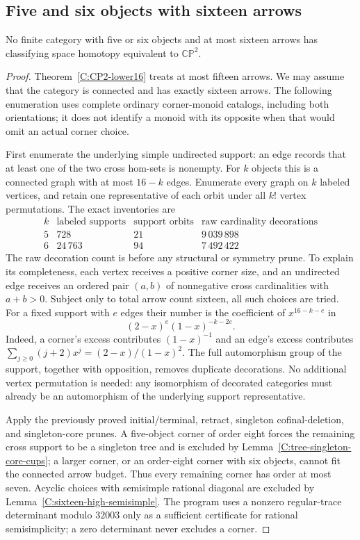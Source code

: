 \subsection{Five and six objects with sixteen arrows}

\begin{theorem}\label{C:sixteen-five-six-objects}
No finite category with five or six objects and at most sixteen
arrows has classifying space homotopy equivalent to
$\mathbb {CP}^2$.
\end{theorem}
\begin{proof}
Theorem~\ref{C:CP2-lower16} treats at most fifteen arrows.
We may assume that the category is connected and has exactly
sixteen arrows.  The following enumeration uses complete
ordinary corner-monoid catalogs, including both orientations;
it does not identify a monoid with its opposite when that
would omit an actual corner choice.

First enumerate the underlying simple undirected support:
an edge records that at least one of the two cross hom-sets
is nonempty.  For $k$ objects this is a connected graph with
at most $16-k$ edges.  Enumerate every graph on $k$ labeled
vertices, and retain one representative of each orbit under
all $k!$ vertex permutations.  The exact inventories are
\[
\begin{array}{c|r|r|r}
 k&\text{labeled supports}&\text{support orbits}&
 \text{raw cardinality decorations}\\ \hline
 5&728&21&9\,039\,898\\
 6&24\,763&94&7\,492\,422
\end{array}
\]
The raw decoration count is before any structural or symmetry
prune.  To explain its completeness, each vertex receives a
positive corner size, and an undirected edge receives an
ordered pair $(a,b)$ of nonnegative cross cardinalities with
$a+b>0$.  Subject only to total arrow count sixteen, all such
choices are tried.  For a fixed support with $e$ edges their
number is the coefficient of $x^{16-k-e}$ in
\[
 (2-x)^e(1-x)^{-k-2e}.
\]
Indeed, a corner's excess contributes $(1-x)^{-1}$ and an
edge's excess contributes
$\sum_{j\geq0}(j+2)x^j=(2-x)/(1-x)^2$.
The full automorphism group of the support, together with
opposition, removes duplicate decorations.  No additional
vertex permutation is needed: any isomorphism of decorated
categories must already be an automorphism of the underlying
support representative.

Apply the previously proved initial/terminal, retract,
singleton cofinal-deletion, and singleton-core prunes.
A five-object corner of order eight forces the remaining
cross support to be a singleton tree and is excluded by
Lemma~\ref{C:tree-singleton-core-cups}; a larger corner,
or an order-eight corner with six objects, cannot fit the
connected arrow budget.  Thus every remaining corner has
order at most seven.  Acyclic choices with semisimple
rational diagonal are excluded by
Lemma~\ref{C:sixteen-high-semisimple}.  The program uses a
nonzero regular-trace determinant modulo $32003$ only as a
sufficient certificate for rational semisimplicity; a zero
determinant never excludes a corner.


\end{proof}
